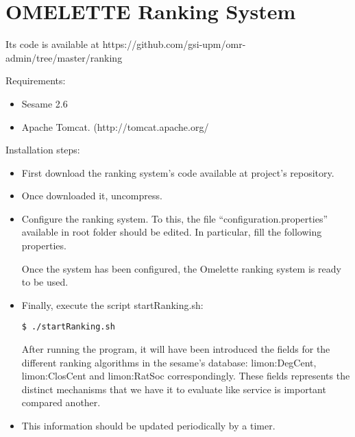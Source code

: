 \chapter{OMELETTE Ranking System}
\label{chap:appendixranking}

Its code is available at https://github.com/gsi-upm/omr-admin/tree/master/ranking

Requirements:
\begin{itemize}
\item Sesame 2.6
\item Apache Tomcat. (http://tomcat.apache.org/
\end{itemize}
Installation steps:
\begin{itemize}
\item First download the ranking system's code available at project's repository.
\item Once downloaded it, uncompress.
\item Configure the ranking system. To this, the file “configuration.properties” available in
       root folder should be edited. In particular, fill the following properties.


Once the system has been configured, the Omelette ranking system is ready to be
used.
\item Finally, execute the script startRanking.sh:
\begin{lstlisting}[style=consola]
$ ./startRanking.sh
\end{lstlisting}

After running the program, it will have been introduced the fields for the different
ranking algorithms in the sesame's database: limon:DegCent, limon:ClosCent and
limon:RatSoc correspondingly. These fields represents the distinct mechanisms that
we have it to evaluate like service is important compared another.
\item This information should be updated periodically by a timer.



\end{itemize}

